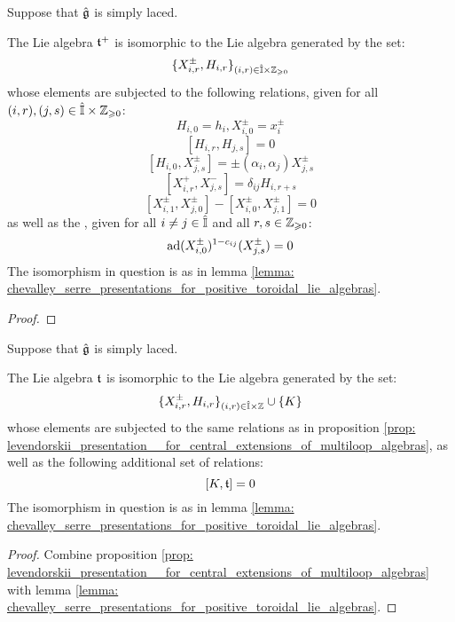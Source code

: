         \begin{proposition} \label{prop: levendorskii_presentation__for_central_extensions_of_multiloop_algebras}
            Suppose that $\hat{\mathfrak{g}}$ is simply laced.
        
            The Lie algebra $\mathfrak{t}^+$ is isomorphic to the Lie algebra  generated by the set:
                $$\{ X_{i, r}^{\pm}, H_{i, r} \}_{(i, r) \in \hat{\simpleroots} \x \Z_{\geq 0}}$$
            whose elements are subjected to the following relations, given for all $(i, r), (j, s) \in \hat{\simpleroots} \x \Z_{\geq 0}$:
                $$H_{i, 0} = h_i, X_{i, 0}^{\pm} = x_i^{\pm}$$
                $$[ H_{i, r}, H_{j, s} ] = 0$$
                $$[ H_{i, 0}, X_{j, s}^{\pm} ] = \pm (\alpha_i, \alpha_j) X_{j, s}^{\pm}$$
                $$[ X_{i, r}^+, X_{j, s}^- ] = \delta_{ij} H_{i, r + s}$$
                $$[ X_{i, 1}^{\pm}, X_{j, 0}^{\pm} ] - [ X_{i, 0}^{\pm}, X_{j, 1}^{\pm} ] = 0$$
            as well as the , given for all $i \not = j \in \hat{\mathbb{I}}$ and all $r, s \in \mathbb{Z}_{\geqslant 0}$:
                $$\mathrm{ad}(X_{i, 0}^{\pm})^{1 - c_{ij}}( X_{j, s}^{\pm} ) = 0$$
            The isomorphism in question is as in lemma \ref{lemma: chevalley_serre_presentations_for_positive_toroidal_lie_algebras}.
        \end{proposition}
            \begin{proof}
                
            \end{proof}
        \begin{corollary}
            Suppose that $\hat{\mathfrak{g}}$ is simply laced.
            
            The Lie algebra $\mathfrak{t}$ is isomorphic to the Lie algebra  generated by the set:
                $$\{ X_{i, r}^{\pm}, H_{i, r} \}_{(i, r) \in \hat{\simpleroots} \x \Z} \cup \{ K \}$$
            whose elements are subjected to the same relations as in proposition \ref{prop: levendorskii_presentation__for_central_extensions_of_multiloop_algebras}, as well as the following additional set of relations:
                $$[K, \mathfrak{t}] = 0$$
            The isomorphism in question is as in lemma \ref{lemma: chevalley_serre_presentations_for_positive_toroidal_lie_algebras}.
        \end{corollary}
            \begin{proof}
                Combine proposition \ref{prop: levendorskii_presentation__for_central_extensions_of_multiloop_algebras} with lemma \ref{lemma: chevalley_serre_presentations_for_positive_toroidal_lie_algebras}. 
            \end{proof}